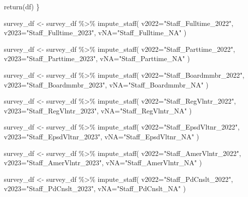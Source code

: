 \documentclass[
  letterpaper,
]{scrbook}
\newenvironment{Shaded}{\begin{snugshade}}{\end{snugshade}}
\newcommand{\AttributeTok}[1]{\textcolor[rgb]{0.40,0.45,0.13}{#1}}
\newcommand{\FunctionTok}[1]{\textcolor[rgb]{0.28,0.35,0.67}{#1}}
\newcommand{\NormalTok}[1]{\textcolor[rgb]{0.00,0.23,0.31}{#1}}
\newcommand{\OtherTok}[1]{\textcolor[rgb]{0.00,0.23,0.31}{#1}}
\newcommand{\SpecialCharTok}[1]{\textcolor[rgb]{0.37,0.37,0.37}{#1}}
\newcommand{\StringTok}[1]{\textcolor[rgb]{0.13,0.47,0.30}{#1}}
\begin{document}
\begin{Shaded}
\begin{Highlighting}[]
  \FunctionTok{return}\NormalTok{(df)}
\NormalTok{\}}


\NormalTok{survey\_df }\OtherTok{\textless{}{-}} 
\NormalTok{  survey\_df }\SpecialCharTok{\%\textgreater{}\%} 
  \FunctionTok{impute\_staff}\NormalTok{( }\AttributeTok{v2022=}\StringTok{"Staff\_Fulltime\_2022"}\NormalTok{, }
                \AttributeTok{v2023=}\StringTok{"Staff\_Fulltime\_2023"}\NormalTok{, }
                \AttributeTok{vNA=}\StringTok{"Staff\_Fulltime\_NA"}\NormalTok{ )}

\NormalTok{survey\_df }\OtherTok{\textless{}{-}} 
\NormalTok{  survey\_df }\SpecialCharTok{\%\textgreater{}\%} 
  \FunctionTok{impute\_staff}\NormalTok{( }\AttributeTok{v2022=}\StringTok{"Staff\_Parttime\_2022"}\NormalTok{, }
                \AttributeTok{v2023=}\StringTok{"Staff\_Parttime\_2023"}\NormalTok{, }
                \AttributeTok{vNA=}\StringTok{"Staff\_Parttime\_NA"}\NormalTok{ )}

\NormalTok{survey\_df }\OtherTok{\textless{}{-}} 
\NormalTok{  survey\_df }\SpecialCharTok{\%\textgreater{}\%} 
  \FunctionTok{impute\_staff}\NormalTok{( }\AttributeTok{v2022=}\StringTok{"Staff\_Boardmmbr\_2022"}\NormalTok{, }
                \AttributeTok{v2023=}\StringTok{"Staff\_Boardmmbr\_2023"}\NormalTok{, }
                \AttributeTok{vNA=}\StringTok{"Staff\_Boardmmbr\_NA"}\NormalTok{ )}

\NormalTok{survey\_df }\OtherTok{\textless{}{-}} 
\NormalTok{  survey\_df }\SpecialCharTok{\%\textgreater{}\%} 
  \FunctionTok{impute\_staff}\NormalTok{( }\AttributeTok{v2022=}\StringTok{"Staff\_RegVlntr\_2022"}\NormalTok{, }
                \AttributeTok{v2023=}\StringTok{"Staff\_RegVlntr\_2023"}\NormalTok{, }
                \AttributeTok{vNA=}\StringTok{"Staff\_RegVlntr\_NA"}\NormalTok{ )}

\NormalTok{survey\_df }\OtherTok{\textless{}{-}} 
\NormalTok{  survey\_df }\SpecialCharTok{\%\textgreater{}\%} 
  \FunctionTok{impute\_staff}\NormalTok{( }\AttributeTok{v2022=}\StringTok{"Staff\_EpsdVltnr\_2022"}\NormalTok{, }
                \AttributeTok{v2023=}\StringTok{"Staff\_EpsdVltnr\_2023"}\NormalTok{, }
                \AttributeTok{vNA=}\StringTok{"Staff\_EpsdVltnr\_NA"}\NormalTok{ )}

\NormalTok{survey\_df }\OtherTok{\textless{}{-}} 
\NormalTok{  survey\_df }\SpecialCharTok{\%\textgreater{}\%} 
  \FunctionTok{impute\_staff}\NormalTok{( }\AttributeTok{v2022=}\StringTok{"Staff\_AmerVlntr\_2022"}\NormalTok{, }
                \AttributeTok{v2023=}\StringTok{"Staff\_AmerVlntr\_2023"}\NormalTok{, }
                \AttributeTok{vNA=}\StringTok{"Staff\_AmerVlntr\_NA"}\NormalTok{ )}

\NormalTok{survey\_df }\OtherTok{\textless{}{-}} 
\NormalTok{  survey\_df }\SpecialCharTok{\%\textgreater{}\%} 
  \FunctionTok{impute\_staff}\NormalTok{( }\AttributeTok{v2022=}\StringTok{"Staff\_PdCnslt\_2022"}\NormalTok{, }
                \AttributeTok{v2023=}\StringTok{"Staff\_PdCnslt\_2023"}\NormalTok{, }
                \AttributeTok{vNA=}\StringTok{"Staff\_PdCnslt\_NA"}\NormalTok{ )}
\end{Highlighting}
\end{Shaded}
\end{document}
